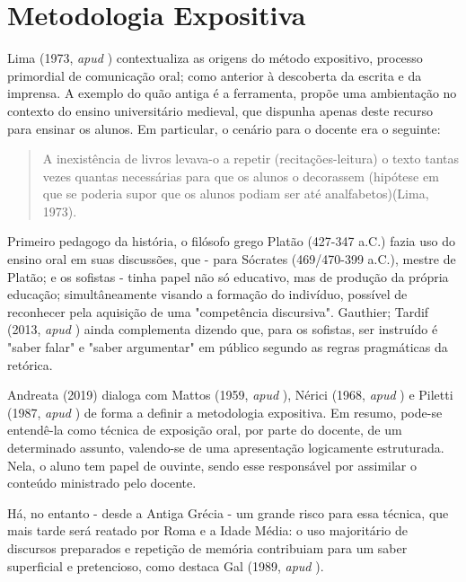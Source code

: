 \section{Metodologia Expositiva}
Lima (1973, \textit{apud} \cite{andreataAulaExpositivaPaulo2019}) contextualiza as origens do método expositivo, processo primordial de comunicação oral; como anterior à descoberta da escrita e da imprensa. A exemplo do quão antiga é a ferramenta, propõe uma ambientação no contexto do ensino universitário medieval, que dispunha apenas deste recurso para ensinar os alunos. Em particular, o cenário para o docente era o seguinte:

\begin{quote}
    A inexistência de livros levava-o a repetir (recitações-leitura) o texto tantas vezes quantas necessárias para que os alunos o decorassem (hipótese em que se poderia supor que os alunos podiam ser até analfabetos)(Lima, 1973).
\end{quote}

Primeiro pedagogo da história, o filósofo grego Platão (427-347 a.C.) fazia uso do ensino oral em suas discussões, que - para Sócrates (469/470-399 a.C.), mestre de Platão; e os sofistas - tinha papel não só educativo, mas de produção da própria educação; simultâneamente visando a formação do indivíduo, possível de reconhecer pela aquisição de uma "competência discursiva". Gauthier; Tardif (2013, \textit{apud} \cite{andreataAulaExpositivaPaulo2019}) ainda complementa dizendo que, para os sofistas, ser instruído é "saber falar" e "saber argumentar" em público segundo as regras pragmáticas da retórica.

Andreata (2019) dialoga com Mattos (1959, \textit{apud} \cite{andreataAulaExpositivaPaulo2019}),
Nérici (1968, \textit{apud} \cite{andreataAulaExpositivaPaulo2019}) e Piletti (1987, \textit{apud} \cite{andreataAulaExpositivaPaulo2019}) de forma a definir a metodologia expositiva. Em resumo, pode-se entendê-la como técnica de exposição oral, por parte do docente, de um determinado assunto, valendo-se de uma apresentação logicamente estruturada. Nela, o aluno tem papel de ouvinte, sendo esse responsável por assimilar o conteúdo ministrado pelo docente.

Há, no entanto - desde a Antiga Grécia - um grande risco para essa técnica, que mais tarde será reatado por Roma e a Idade Média: o uso majoritário de discursos preparados e repetição de memória contribuiam para um saber superficial e pretencioso, como destaca Gal (1989, \textit{apud} \cite{andreataAulaExpositivaPaulo2019}).

